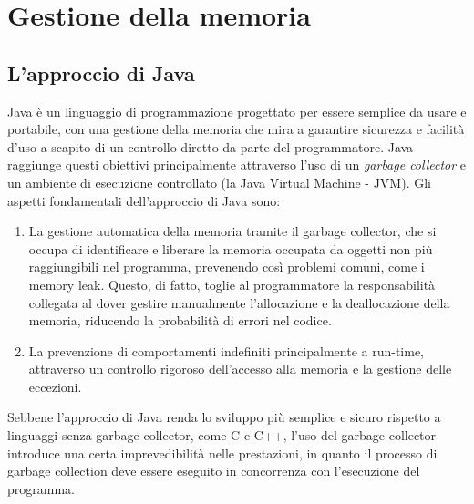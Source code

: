 
\chapter{Gestione della memoria}

\section{L'approccio di Java}
Java è un linguaggio di programmazione progettato per essere semplice da usare e portabile, con una gestione della memoria che mira a garantire sicurezza e facilità d'uso a scapito di un controllo diretto da parte del programmatore. Java raggiunge questi obiettivi principalmente attraverso l'uso di un \textit{garbage collector} e un ambiente di esecuzione controllato (la Java Virtual Machine - JVM). Gli aspetti fondamentali dell'approccio di Java sono:

\begin{enumerate}
\item La gestione automatica della memoria tramite il garbage collector, che si occupa di identificare e liberare la memoria occupata da oggetti non più raggiungibili nel programma, prevenendo così problemi comuni, come i memory leak. Questo, di fatto, toglie al programmatore la responsabilità collegata al dover gestire manualmente l'allocazione e la deallocazione della memoria, riducendo la probabilità di errori nel codice.
\item La prevenzione di comportamenti indefiniti principalmente a run-time, attraverso un controllo rigoroso dell'accesso alla memoria e la gestione delle eccezioni. 
\end{enumerate}

Sebbene l'approccio di Java renda lo sviluppo più semplice e sicuro rispetto a linguaggi senza garbage collector, come C e C++, l'uso del garbage collector introduce una certa imprevedibilità nelle prestazioni, in quanto il processo di garbage collection deve essere eseguito in concorrenza con l'esecuzione del programma. 
